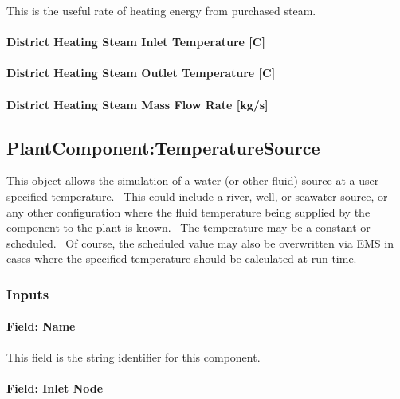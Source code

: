 This is the useful rate of heating energy from purchased steam.

\paragraph{District Heating Steam Inlet Temperature {[}C{]}}\label{district-heating-steam-inlet-temperature-c}

\paragraph{District Heating Steam Outlet Temperature {[}C{]}}\label{district-heating-steam-outlet-temperature-c}

\paragraph{District Heating Steam Mass Flow Rate {[}kg/s{]}}\label{district-heating-steam-mass-flow-rate-kgs}

\subsection{PlantComponent:TemperatureSource}\label{plantcomponenttemperaturesource}

This object allows the simulation of a water (or other fluid) source at a user-specified temperature.~ This could include a river, well, or seawater source, or any other configuration where the fluid temperature being supplied by the component to the plant is known.~ The temperature may be a constant or scheduled.~ Of course, the scheduled value may also be overwritten via EMS in cases where the specified temperature should be calculated at run-time.

\subsubsection{Inputs}\label{inputs-18-006}

\paragraph{Field: Name}\label{field-name-17-005}

This field is the string identifier for this component.

\paragraph{Field: Inlet Node}\label{field-inlet-node-000}

